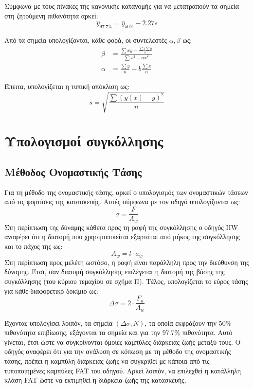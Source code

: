 \documentclass{article}
\begin{document}
Σύμφωνα με τους πίνακες της κανονικής κατανομής για να μετατραπούν τα σημεία στη ζητούμενη πιθανότητα αρκεί:
\begin{equation}
    \hat{y}_{97.7\%} = \hat{y}_{50\%} - 2.27s
\end{equation}

Από τα σημεία υπολογίζονται, κάθε φορά, οι συντελεστές $\alpha, \beta$ ως:
\begin{align}
    \beta &= \frac{\sum xy - \frac{\sum x \sum y}{n}}{\sum x^2 -n\overline{x}^2}\\
    \alpha &= \frac{\sum y}{n} - b\frac{\sum x}{n}
\end{align} 

Έπειτα, υπολογίζεται η τυπική απόκλιση ως:
\begin{equation}
    s = \sqrt{\frac{\sum (y(\overline{x}) - \overline{y})^2}{n}}
\end{equation}




\section{Υπολογισμοί συγκόλλησης}
\subsection{Μέθοδος Ονομαστικής Τάσης}
Για τη μέθοδο της ονομαστικής τάσης, αρκεί ο υπολογισμός των ονομαστικών τάσεων από τις φορτίσεις της κατασκευής. Αυτές σύμφωνα με τον οδηγό υπολογίζονται ως:
\begin{equation}
    \sigma = \frac{F}{A_w}
\end{equation}
Στη περίπτωση της δύναμης κάθετα προς τη ραφή της συγκόλλησης ο οδηγός IIW αναφέρει ότι η διατομή που χρησιμοποιείται εξαρτάται από μήκος της συγκόλλησης και το πάχος της ως:
\begin{equation}
    A_w = l\cdot a_w
\end{equation}
Στη περίπτωση προς μελέτη ωστόσο, η ραφή είναι παράλληλη προς την διεύθυνση της δύναμης. Έτσι, σαν διατομή συγκόλλησης επιλέγεται η διατομή της βάσης της συγκόλλησης (του κύριου τεμαχίου σε σχήμα Π). Τέλος, υπολογίζεται το εύρος τάσης για κάθε διαφορετικό δοκίμιο ως:
\begin{equation}
    \Delta \sigma = 2\cdot \frac{F_a}{A_w}
\end{equation}

Έχοντας υπολογίσει λοιπόν, τα σημεία $(\Delta \sigma, N)$, τα οποία εκφράζουν την $50\%$ πιθανότητα επιβίωσης, εξάγονται τα σημεία και για την $97.7\%$ πιθανότητα. Αυτό γίνεται, έτσι ώστε να συγκρίνονται όμοιες καμπύλες διάρκειας ζωής μεταξύ τους. Ο οδηγός αναφέρει ότι για την ανάλυση σε κόπωση με τη μέθοδο της ονομαστικής τάσης, πρέπει η καμπύλη διάρκειας ζωής να συγκριθεί με κάποια από τις τυποποιημένες καμπύλες FAT του οδηγού. Αρκεί λοιπόν, να επιλεχθεί η κατάλληλη κλάση FAT ώστε να εκτιμηθεί η διάρκεια ζωής της κατασκευής.
\end{document}
